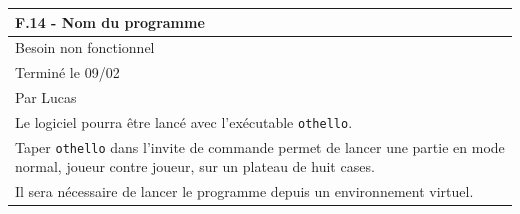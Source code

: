 \documentclass[a4paper,12pt]{article}
\begin{document}
\noindent
\setlength{\arrayrulewidth}{1.5pt}
\renewcommand{\arraystretch}{1.5}
\begin{tabularx}{\textwidth}{|X|}
    \hline
    \textbf{F.14 - Nom du programme}                                                                                                                 \\
    \hline
    Besoin non fonctionnel                                                                                                                           \\
    \hline
    Terminé le 09/02                                                                                                                                 \\
    Par Lucas                                                                                                                                        \\
    \hline
    Le logiciel pourra être lancé avec l’exécutable \texttt{othello}.                                                                                \\
    Taper \texttt{othello} dans l’invite de commande permet de lancer une partie en mode normal, joueur contre joueur, sur un plateau de huit cases. \\
    Il sera nécessaire de lancer le programme depuis un environnement virtuel.                                                                       \\
    \hline
\end{tabularx}

\vspace{1cm}
\end{document}
